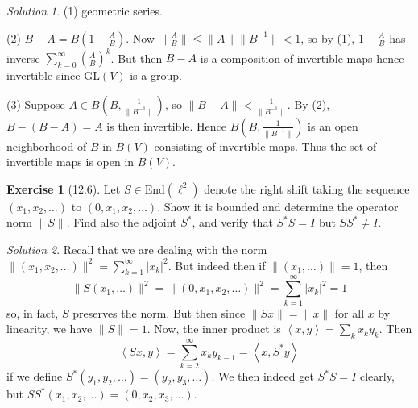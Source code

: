 \documentclass[reqno]{amsart}
\theoremstyle{definition}
\newtheorem{exercise}[theorem]{Exercise}
\theoremstyle{remark}
\newtheorem*{solution}{Solution}
\newcommand{\End}{{\mathrm{End}}}
\begin{document}
    \begin{solution}
        (1) geometric series.

        (2) $B - A = B \left( 1 - \frac{A}{B} \right) $.
        Now $\|\frac{A}{B}\| \le 
        \|A\| \|B^{-1}\| < 1$, so
        by (1),  $1 - \frac{A}{B}$ has inverse
        $\sum_{k=0}^{\infty} \left( \frac{A}{B} \right)^{k}$.
        But then $B - A$ is a composition of invertible
        maps hence invertible since $\text{GL} (V)$ is a group.

        (3) Suppose 
        $A \in B\left( B, \frac{1}{\|B^{-1}\|} \right) $, so
        $\| B - A\| < \frac{1}{\|B^{-1}\|}$. By (2), 
        $B - (B-A) = A$ is then invertible. Hence
        $B \left( B, \frac{1}{\|B^{-1}\|} \right) $ is an
        open neighborhood of $B$ in $B(V)$ consisting
        of invertible maps. Thus the
        set of invertible maps is open in $B(V)$.
    \end{solution}

    \begin{exercise}[12.6]
        Let $S \in \End \left( \ell^2 \right) $ denote the
        right shift taking the sequence
        $\left( x_1, x_2, \ldots \right) $  to
        $\left( 0, x_1, x_2, \ldots \right) $. Show it
        is bounded and determine the operator
        norm $\|S\|$. Find also the adjoint $S^{*}$, and
        verify that $S^{*}S = I$ but
        $S S^{*} \neq I$.
    \end{exercise}

    \begin{solution}
        Recall that we are dealing with the norm
        $\| \left( x_1, x_2, \ldots \right) \|^2
        = \sum_{k=1}^{\infty} \left| x_k \right|^2 $.
        But indeed then if
        $\|\left( x_1, \ldots \right) \| = 1$, then
        \[
        \|S \left( x_1, \ldots \right) 
        \|^2 = 
        \| \left( 0, x_1, x_2, \ldots \right) \|^2
        = \sum_{k=1}^{\infty} \left| x_k \right|^2
        = 1
        \] 
        so, in fact, $S$ preserves the norm.
        But then
        since $\|S x\| = \|x\|$ for all $x$ by linearity, we have
        $\|S\| = 1$.
        Now, the inner product is
        $\left<x,y \right> = 
        \sum_k x_k \overline{y_k}$. Then
        \[
        \left< Sx,y \right>
        = \sum_{k=2}^{\infty} x_{k} y_{k-1} =
        \left< x, S^{*}y \right>
        \] 
        if we define $S^{*}\left( y_1, y_2, \ldots \right) 
        = \left( y_2, y_3 , \ldots \right) $.
        We then indeed get
        $S^{*}S = I$ clearly, but
        $S S^{*} \left( x_1,x_2,  \ldots \right) 
        = \left( 0, x_2, x_3, \ldots \right) $.
    \end{solution}
\end{document}
